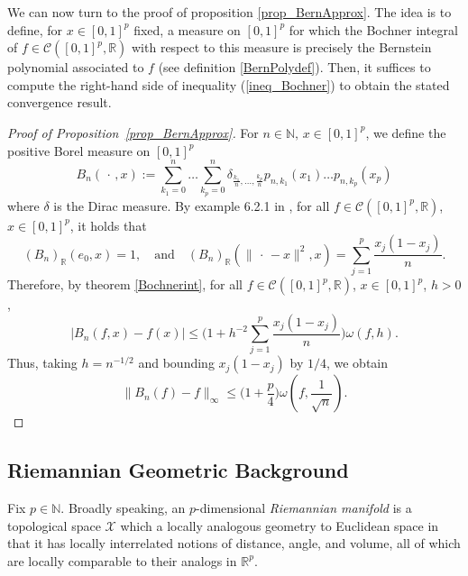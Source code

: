 \documentclass[anon,12pt]{colt2021} %
\newcommand{\rr}{{\mathbb{R}}}
\newcommand{\rrflex}[1]{{\ensuremath{\rr^{#1}
}}}
\newcommand{\rrp}{{\rrflex{p}}}
\newcommand{\xxx}{\mathcal{X}}
\newcommand{\nn}{{\mathbb{N}}}
\begin{document}
We can now turn to the proof of proposition \ref{prop_BernApprox}. The idea is to define, for $x \in [0,1]^{p}$ fixed, a measure on $[0,1]^{p}$ for which the Bochner integral of $f \in \mathcal{C}([0,1]^{p}, \mathbb{R})$ with respect to this measure is precisely the Bernstein polynomial associated to $f$ (see definition \ref{BernPolydef}). Then, it suffices to compute the right-hand side of inequality (\ref{ineq_Bochner}) to obtain the stated convergence result.
\begin{proof}[{Proof of Proposition~\ref{prop_BernApprox}}]
For $n \in \mathbb{N}, \, x \in [0,1]^{p}$, we define the positive Borel measure on $[0,1]^{p}$
\begin{equation*}
    B_{n}(\, \cdot \,, x) := \sum_{k_{1}=0}^{n} \dots \sum_{k_{p}=0}^{n} \delta_{\frac{k_{1}}{n}, \dots, \frac{k_{p}}{n}} p_{n, k_{1}}(x_{1}) \dots p_{n, k_{p}}(x_{p})
\end{equation*}
where $\delta$ is the Dirac measure. By example 6.2.1 in \cite{ApproxTheory}, for all $f \in \mathcal{C}([0,1]^{p}, \mathbb{R})$, $x \in [0,1]^{p}$, it holds that
\begin{equation*}
     (B_{n})_{\mathbb{R}}(e_{0},x) = 1, \quad \text{and} \quad (B_{n})_{\mathbb{R}}( \| \, \cdot \, - x \|^{2}, x) = \sum_{j=1}^{p} \frac{x_{j}(1-x_{j})}{n}.
\end{equation*}
Therefore, by theorem \ref{Bochnerint}, for all $f \in \mathcal{C}([0,1]^{p}, \mathbb{R})$, $x \in [0,1]^{p}$, $h>0$,
\begin{equation*}
    \big \vert  B_{n} (f, x) - f(x)  \big \vert \leq \bigg( 1 + h^{-2} \sum_{j=1}^{p} \frac{x_{j}(1-x_{j})}{n} \bigg)\omega(f,h).
\end{equation*}
Thus, taking $h=n^{-1/2}$ and bounding $x_{j}(1-x_{j})$ by $1/4$, we obtain
\begin{equation*}
    \| B_{n}(f) - f \|_{\infty} \leq \bigg( 1 + \frac{p}{4} \bigg) \omega(f, \frac{1}{\sqrt{n}}).
\end{equation*}
\end{proof}
\subsection{Riemannian Geometric Background}\label{ss_Background_Riem_Geo}
Fix $p \in \nn$.  Broadly speaking, an $p$-dimensional \textit{Riemannian manifold} is a topological space $\xxx$ which a locally analogous geometry to Euclidean space in that it has locally interrelated notions of distance, angle, and volume, all of which are locally comparable to their analogs in $\rrp$.    
\end{document}
